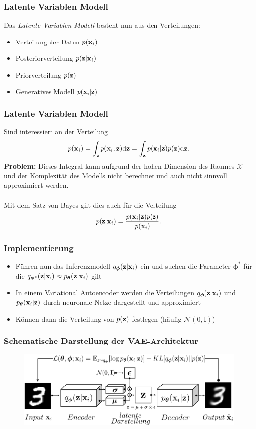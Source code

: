 \begin{frame}
	\frametitle{Latente Variablen Modell}
	Das \emph{Latente Variablen Modell} besteht nun aus den Verteilungen:
	\begin{itemize}
		\item Verteilung der Daten $p(\mathbf{x}_i)$
		\item Posteriorverteilung $p(\mathbf{z}|\mathbf{x}_i)$
		\item Priorverteilung $p(\mathbf{z})$
		\item Generatives Modell $p(\mathbf{x}_i|\mathbf{z})$
	\end{itemize}
\end{frame}

\begin{frame}
	\frametitle{Latente Variablen Modell}
	Sind interessiert an der Verteilung
	\[p(\mathbf{x}_i)= \int_{\mathbf{z}} p(\mathbf{x}_i,\mathbf{z}) \mathrm{d}\textbf{z} = \int_{\mathbf{z}} p(\mathbf{x}_i|\mathbf{z})p(\mathbf{z}) \mathrm{d}\mathbf{z}.\]
	\textbf{Problem:} Dieses Integral kann aufgrund der hohen Dimension des Raumes $\mathcal{X}$ und der Komplexität des Modells 
	nicht berechnet und auch nicht sinnvoll approximiert werden. \\ \ 
	\\
	Mit dem Satz von Bayes gilt dies auch für die Verteilung
	\[p(\mathbf{z}|\mathbf{x}_i)= \frac{p(\mathbf{x}_i|\mathbf{z})p(\mathbf{z})}{p(\mathbf{x}_i)}.\]
\end{frame}

\begin{frame}
	\frametitle{Implementierung}
		\begin{itemize}
		\item Führen nun das Inferenzmodell $q_{\boldsymbol\phi}(\mathbf{z}|\mathbf{x}_i)$ ein und suchen die Parameter $\boldsymbol\phi^{*}$ für die $q_{\boldsymbol\phi^{*}}(\mathbf{z}|\mathbf{x}_i) \approx p_{\boldsymbol\theta}(\mathbf{z}|\mathbf{x}_i)$ gilt 
		\item In einem Variational Autoencoder werden die Verteilungen $q_{\boldsymbol\phi}(\mathbf{z}|\mathbf{x}_i)$ und $p_{\boldsymbol\theta}(\mathbf{x}_i|\mathbf{z})$ durch neuronale Netze dargestellt und approximiert
		\item Können dann die Verteilung von $p(\mathbf{z})$ festlegen (häufig $\mathcal{N}(0,\textbf{I})$)
	\end{itemize}
\end{frame}

\begin{frame}
	\frametitle{Schematische Darstellung der VAE-Architektur}
	\begin{figure}[htbp!]
		\includegraphics[scale=0.27]{Bilder/VAE-Modell.PNG}
	\end{figure}
\end{frame}